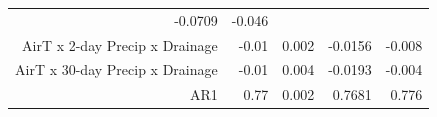\documentclass[]{article}
\begin{document}
\begin{longtable}[]{@{}rrrrr@{}}
\begin{minipage}[t]{0.10\columnwidth}
-0.0709\strut
\end{minipage} & \begin{minipage}[t]{0.10\columnwidth}\raggedleft\strut
-0.046\strut
\end{minipage}\tabularnewline
\begin{minipage}[t]{0.37\columnwidth}\raggedleft\strut
AirT x 2-day Precip x Drainage\strut
\end{minipage} & \begin{minipage}[t]{0.08\columnwidth}\raggedleft\strut
-0.01\strut
\end{minipage} & \begin{minipage}[t]{0.07\columnwidth}\raggedleft\strut
0.002\strut
\end{minipage} & \begin{minipage}[t]{0.10\columnwidth}\raggedleft\strut
-0.0156\strut
\end{minipage} & \begin{minipage}[t]{0.10\columnwidth}\raggedleft\strut
-0.008\strut
\end{minipage}\tabularnewline
\begin{minipage}[t]{0.37\columnwidth}\raggedleft\strut
AirT x 30-day Precip x Drainage\strut
\end{minipage} & \begin{minipage}[t]{0.08\columnwidth}\raggedleft\strut
-0.01\strut
\end{minipage} & \begin{minipage}[t]{0.07\columnwidth}\raggedleft\strut
0.004\strut
\end{minipage} & \begin{minipage}[t]{0.10\columnwidth}\raggedleft\strut
-0.0193\strut
\end{minipage} & \begin{minipage}[t]{0.10\columnwidth}\raggedleft\strut
-0.004\strut
\end{minipage}\tabularnewline
\begin{minipage}[t]{0.37\columnwidth}\raggedleft\strut
AR1\strut
\end{minipage} & \begin{minipage}[t]{0.08\columnwidth}\raggedleft\strut
0.77\strut
\end{minipage} & \begin{minipage}[t]{0.07\columnwidth}\raggedleft\strut
0.002\strut
\end{minipage} & \begin{minipage}[t]{0.10\columnwidth}\raggedleft\strut
0.7681\strut
\end{minipage} & \begin{minipage}[t]{0.10\columnwidth}\raggedleft\strut
0.776\strut
\end{minipage}\tabularnewline
\bottomrule
\end{longtable}
\end{document}
